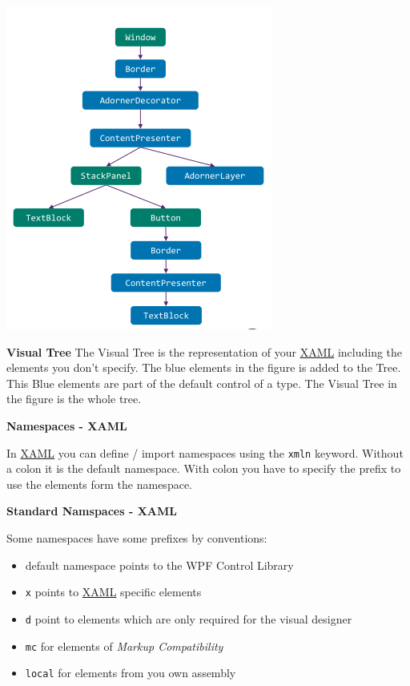 \documentclass[10pt,twoside,landscape]{article}
\begin{document}
\begin{multicols}{3}
\begin{center}
\includegraphics[width=.9\linewidth]{img/visual_logical_tree.png}
\label{orgfde3f74}
\end{center}

\textbf{Visual Tree}
The Visual Tree is the representation of your \href{../../../roam/20211123162058-xaml.org}{XAML} including the elements you don't specify.
The blue elements in the figure is added to the Tree.
This Blue elements are part of the default control of a type.
The Visual Tree in the figure is the whole tree.

\textbf{Namespaces - XAML}

In \href{../../../roam/20211123162058-xaml.org}{XAML} you can define / import namespaces using the \texttt{xmln} keyword.
Without a colon it is the default namespace.
With colon you have to specify the prefix to use the elements form the namespace. 

\textbf{Standard Namspaces - XAML}

Some namespaces have some prefixes by conventions:
\begin{itemize}
\item default namespace points to the WPF Control Library
\item \texttt{x} points to \href{../../../roam/20211123162058-xaml.org}{XAML} specific elements
\item \texttt{d} point to elements which are only required for the visual designer
\item \texttt{mc} for elements of \emph{Markup Compatibility}
\item \texttt{local} for elements from you own assembly
\end{itemize}



\end{multicols}
\end{document}
